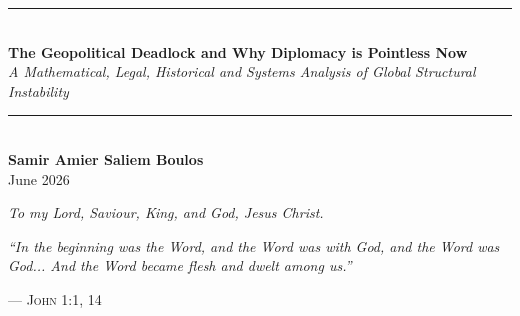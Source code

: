 \documentclass[11pt,openany]{book}
\theoremstyle{plain}
\theoremstyle{definition}
\begin{document}
\begin{titlepage}
    \centering
    \vspace*{\fill} 

    \noindent\rule{\textwidth}{1pt} \\[1.5em]

    {\Huge \textbf{The Geopolitical Deadlock and Why Diplomacy is Pointless Now}} \\[1.5em]

    {\Large \textit{A Mathematical, Legal, Historical and Systems Analysis of Global Structural Instability}} \\[1.2em]

    \noindent\rule{\textwidth}{1pt} \\[3cm]

    {\Large \textbf{Samir Amier Saliem Boulos}} \\
    \vspace{1cm}
    {\large June 2026}

    \vspace*{\fill} 
\end{titlepage}

\frontmatter

\cleardoublepage
\thispagestyle{empty}
\vspace*{0.3\textheight}
\begin{center}
    {\Large\itshape To my Lord, Saviour, King, and God, Jesus Christ.}
\end{center}
\clearpage

\cleardoublepage
\thispagestyle{empty}
\vspace*{0.3\textheight}
\begin{flushright}
    \begin{minipage}{0.7\textwidth}
        \raggedleft
        \Large\itshape
        ``In the beginning was the Word, and the Word was with God, and the Word was God... And the Word became flesh and dwelt among us.''
        
        \vspace{0.5em}
        \normalsize\normalfont\textsc{— John 1:1, 14}
    \end{minipage}
\end{flushright}
\clearpage

\tableofcontents
\end{document}
